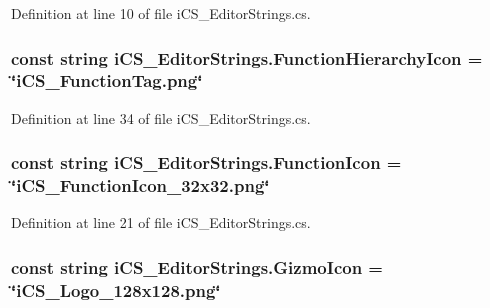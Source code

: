 Definition at line 10 of file i\+C\+S\+\_\+\+Editor\+Strings.\+cs.

\hypertarget{classi_c_s___editor_strings_ab885aa4f445b504f01eabedf271c180e}{
\subsubsection[{Function\+Hierarchy\+Icon}]{\setlength{\rightskip}{0pt plus 5cm}const string i\+C\+S\+\_\+\+Editor\+Strings.\+Function\+Hierarchy\+Icon = \char`\"{}i\+C\+S\+\_\+\+Function\+Tag.\+png\char`\"{}}}\label{classi_c_s___editor_strings_ab885aa4f445b504f01eabedf271c180e}


Definition at line 34 of file i\+C\+S\+\_\+\+Editor\+Strings.\+cs.

\hypertarget{classi_c_s___editor_strings_a7e1d66c8e7078efe974b9899502c7af4}{
\subsubsection[{Function\+Icon}]{\setlength{\rightskip}{0pt plus 5cm}const string i\+C\+S\+\_\+\+Editor\+Strings.\+Function\+Icon = \char`\"{}i\+C\+S\+\_\+\+Function\+Icon\+\_\+32x32.\+png\char`\"{}}}\label{classi_c_s___editor_strings_a7e1d66c8e7078efe974b9899502c7af4}


Definition at line 21 of file i\+C\+S\+\_\+\+Editor\+Strings.\+cs.

\hypertarget{classi_c_s___editor_strings_adf3eb073880a892c07e747c76bae44f0}{
\subsubsection[{Gizmo\+Icon}]{\setlength{\rightskip}{0pt plus 5cm}const string i\+C\+S\+\_\+\+Editor\+Strings.\+Gizmo\+Icon = \char`\"{}i\+C\+S\+\_\+\+Logo\+\_\+128x128.\+png\char`\"{}}}\label{classi_c_s___editor_strings_adf3eb073880a892c07e747c76bae44f0}


